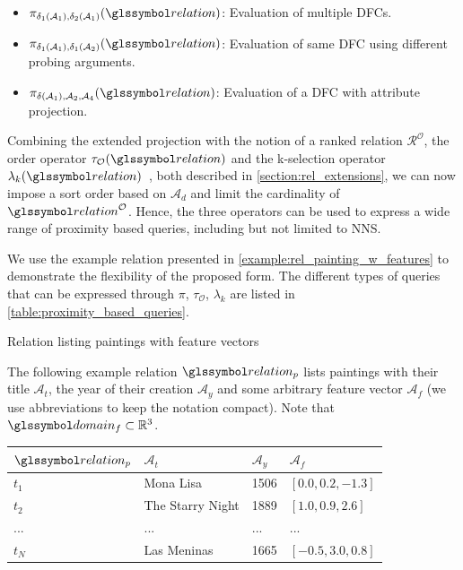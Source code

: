 \begin{itemize}
    \item $\pi_{\delta_1(\mathcal{A}_1), \delta_2(\mathcal{A}_1)}(\relation)$: Evaluation of multiple DFCs.
    \item $\pi_{\delta_1(\mathcal{A}_1), \delta_1(\mathcal{A}_2)}(\relation)$: Evaluation of same DFC using different probing arguments.
    \item $\pi_{\delta(\mathcal{A}_1), \mathcal{A}_2, \mathcal{A}_4}(\relation)$: Evaluation of a DFC with attribute projection.
\end{itemize}

Combining the extended projection with the notion of a ranked relation $\mathcal{R^{\mathcal{O}}}$, the order operator $\tau_{\mathcal{O}}(\relation)$ and the k-selection operator $\lambda_k(\relation)$~\cite{Chengkai:2005RankSQL}, both described in \cref{section:rel_extensions}, we can now impose a sort order based on $\mathcal{A}_d$ and limit the cardinality of $\relation^{\mathcal{O}}$. Hence, the three operators can be used to express a wide range of proximity based queries, including but not limited to NNS.

We use the example relation presented in \cref{example:rel_painting_w_features} to demonstrate the flexibility of the proposed form. The different types of queries that can be expressed through $\pi$, $\tau_{\mathcal{O}}$, $\lambda_k$ are listed in \cref{table:proximity_based_queries}.

\begin{example}[label=example:rel_painting_w_features]{Relation listing paintings with feature vectors}{}
    
    The following example relation $\relation_{p}$ lists paintings with their title $\mathcal{A}_{t}$, the year of their creation $\mathcal{A}_{y}$ and some arbitrary feature vector $\mathcal{A}_{f}$ (we use abbreviations to keep the notation compact). Note that $\domain_{f} \subset \mathbb{R}^{3}$.
        
    \begin{center}
        \begin{tabular}{ l || l | l | l |}
            $\relation_{p}$ & $\mathcal{A}_{t}$  & $\mathcal{A}_{y}$  & $\mathcal{A}_{f}$ \\ 
            \hline
            \hline
            $t_1$ & Mona Lisa & 1506 & $\left\lbrack 0.0, 0.2, -1.3 \right\rbrack$ \\
            \hline
            $t_2$ & The Starry Night & 1889 & $\left\lbrack 1.0, 0.9, 2.6 \right\rbrack$ \\
            \hline
            ... & ... & ... & ... \\
            \hline
            $t_N$ & Las Meninas & 1665 & $\left\lbrack -0.5, 3.0, 0.8 \right\rbrack$ \\
            \hline
        \end{tabular}
    \end{center}
\end{example}

